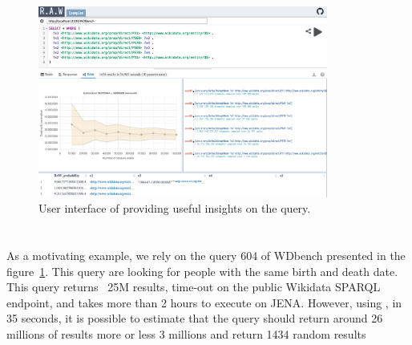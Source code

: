 
\begin{figure}
  \centering
  \includegraphics[width=0.85\textwidth]{figures/raw_screenshot.png}
  \caption{\label{fig:raw_screenshot}User interface of \NAME providing useful insights on the query.}
\end{figure}


 \section{\NAME}
 

 
 As a motivating example, we rely on the query 604 of
 WDbench\cite{angles2022wdbench} presented in the
 figure~\ref{fig:raw_screenshot}. This query are looking for people
 with the same birth and death date. This query returns ~25M results,
 time-out on the public Wikidata SPARQL endpoint, and takes more than
 2 hours to execute on JENA. However, using \NAME, in 35 seconds, it
 is possible to estimate that the query should return around 26
 millions of results more or less 3 millions and return 1434 random
 results


